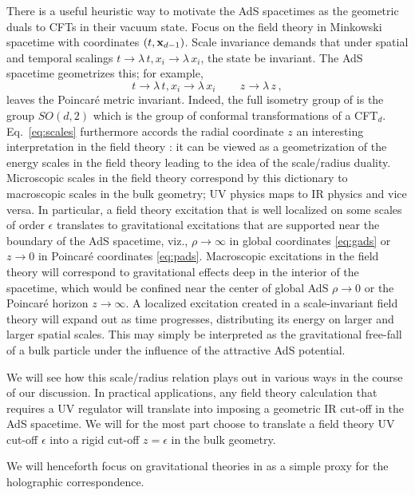 \documentclass[12pt,openany]{book}
\begin{document}
There is a useful heuristic way to motivate the AdS spacetimes as the geometric duals to CFTs in their vacuum state. Focus on the field theory in Minkowski spacetime with coordinates $(t,{\bf x}_{d-1})$. Scale invariance demands that under spatial and temporal scalings
$t\to \lambda \, t, x_i \to \lambda\, x_i$, the state be invariant. The AdS spacetime geometrizes this; for example,
%
\begin{equation}
 t\to \lambda \, t, x_i \to \lambda\, x_i \, \qquad z \to \lambda \, z \,,
\label{eq:scales}
\end{equation}
%
leaves the Poincar\'e metric invariant.  Indeed, the full isometry group of  is the group $SO(d,2)$ which is the group of conformal transformations of a CFT$_d$. Eq.~\eqref{eq:scales} furthermore accords the radial coordinate $z$ an interesting interpretation in the field theory \cite{Susskind:1998dq}: it can be viewed as a geometrization of the energy scales in the field theory  leading to the idea of the scale/radius duality. Microscopic scales in the field theory correspond by this dictionary to macroscopic scales in the bulk geometry; UV physics maps to IR physics and vice versa. In particular, a field theory excitation that is well localized on some scales of order $\epsilon$ translates to gravitational excitations that are supported near the boundary of the AdS spacetime, viz., $\rho \to \infty$ in global coordinates \eqref{eq:gads} or $z\to 0$ in Poincar\'e coordinates \eqref{eq:pads}.
 Macroscopic excitations in the field theory will correspond to gravitational effects deep in the interior of the spacetime, which would be confined near the center of global AdS $\rho \to 0$ or the Poincar\'e horizon $z\to \infty$. A localized excitation created in a scale-invariant field theory will expand out as time progresses, distributing its energy on larger and larger spatial scales. This may  simply be interpreted as the gravitational free-fall of a bulk particle under the influence of the attractive AdS potential.

 We will see how this scale/radius relation plays out in various ways in the course of our discussion. In practical applications, any field theory calculation that requires a UV regulator will translate into imposing a geometric IR cut-off in the AdS spacetime. We will for the most part choose to translate a field theory UV cut-off $\epsilon$ into a rigid cut-off $z = \epsilon$ in the bulk geometry.

We will henceforth focus on gravitational theories in  as a simple proxy for the holographic correspondence.
\end{document}
